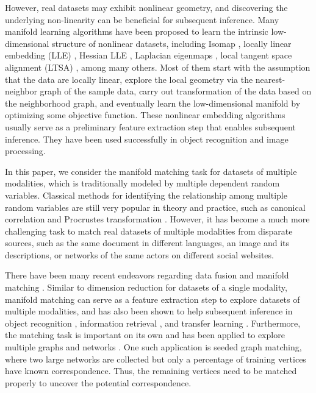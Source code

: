 \documentclass[times,twocolumn,final]{elsarticle}
\begin{document}
However, real datasets may exhibit nonlinear geometry, and discovering the underlying non-linearity can be beneficial for subsequent inference. Many manifold learning algorithms have been proposed to learn the intrinsic low-dimensional structure of nonlinear datasets, including Isomap \citep{TenenbaumSilvaLangford2000, SilvaTenenbaum2003}, locally linear embedding (LLE) \citep{SaulRoweis2000, RoweisSaul2003}, Hessian LLE \citep{DonohoGrimes2003}, Laplacian eigenmaps \citep{BelkinNiyogi2003, HeEtAl2005}, local tangent space alignment (LTSA) \citep{ZhangZha2004, ZhangWangZha2012}, among many others. Most of them start with the assumption that the data are locally linear, explore the local geometry via the nearest-neighbor graph of the sample data, carry out transformation of the data based on the neighborhood graph, and eventually learn the low-dimensional manifold by optimizing some objective function. These nonlinear embedding algorithms usually serve as a preliminary feature extraction step that enables subsequent inference. They have been used successfully in object recognition and image processing. 

In this paper, we consider the manifold matching task for datasets of multiple modalities, which is traditionally modeled by multiple dependent random variables. Classical methods for identifying the relationship among multiple random variables are still very popular in theory and practice, such as canonical correlation \citep{Hotelling1936, Kettenring1971, Hardoon2004} and Procrustes transformation \citep{Sibson1978, Sibson1979, GoldbergRitov2009, GowerProcrustesBook}. However, it has become a much more challenging task to match real datasets of multiple modalities from disparate sources, such as the same document in different languages, an image and its descriptions, or networks of the same actors on different social websites. 

There have been many recent endeavors regarding data fusion and manifold matching \citep{LafonKellerCoifman2006, WangMahadevan2008, WangMahadevan2012, SharmaKumar2012, PriebeMarchette2012, SunPriebeTang2013, ShenSunTangPriebe2014}. Similar to dimension reduction for datasets of a single modality, manifold matching can serve as a feature extraction step to explore datasets of multiple modalities, and has also been shown to help subsequent inference in object recognition \citep{KimKittlerCipolla2007}, information retrieval \citep{SunPriebe2012}, and transfer learning \citep{PanYang2010}. Furthermore, the matching task is important on its own and has been applied to explore multiple graphs and networks \citep{LyzinskiFishkindPriebe2014, JoshuaEtAl2015, LyzinskiFishkindPriebe2016}. One such application is seeded graph matching, where two large networks are collected but only a percentage of training vertices have known correspondence. Thus, the remaining vertices need to be matched properly to uncover the potential correspondence.
\end{document}
